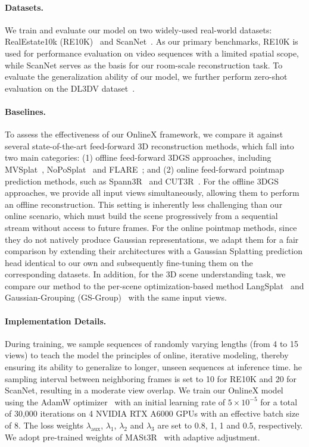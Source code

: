 \paragraph{Datasets.} We train and evaluate our model on two widely-used real-world datasets: RealEstate10k (RE10K)~\cite{zhou2018stereo} and ScanNet~\cite{dai2017scannet}. As our primary benchmarks, RE10K is used for performance evaluation on video sequences with a limited spatial scope, while ScanNet serves as the basis for our room-scale reconstruction task. To evaluate the generalization ability of our model, we further perform zero-shot evaluation on the DL3DV dataset~\cite{ling2024dl3dv}.

\paragraph{Baselines.} To assess the effectiveness of our OnlineX framework, we compare it against several state-of-the-art feed-forward 3D reconstruction methods, which fall into two main categories: (1) offline feed-forward 3DGS approaches, including MVSplat~\cite{chen2024mvsplat}, NoPoSplat~\cite{ye2024no} and FLARE~\cite{zhang2025flare}; and (2) online feed-forward pointmap prediction methods, such as Spann3R~\cite{wang20243d} and CUT3R~\cite{wang2025continuous}. For the offline 3DGS approaches, we provide all input views simultaneously, allowing them to perform an offline reconstruction. This setting is inherently less challenging than our online scenario, which must build the scene progressively from a sequential stream without access to future frames. For the online pointmap methods, since they do not natively produce Gaussian representations, we adapt them for a fair comparison by extending their architectures with a Gaussian Splatting prediction head identical to our own and subsequently fine-tuning them on the corresponding datasets. In addition, for the 3D scene understanding task, we compare our method to the per-scene optimization-based method LangSplat~\cite{qin2024langsplat} and Gaussian-Grouping (GS-Group)~\cite{ye2024gaussian} with the same input views.  



\paragraph{Implementation Details.} During training, we sample sequences of randomly varying lengths (from 4 to 15 views) to teach the model the principles of online, iterative modeling, thereby ensuring its ability to generalize to longer, unseen sequences at inference time. he sampling interval between neighboring frames is set to 10 for RE10K and 20 for ScanNet, resulting in a moderate view overlap. We train our OnlineX model using the AdamW optimizer~\cite{loshchilov2017fixing} with an initial learning rate of $5 \times 10^{-5}$ for a total of 30,000 iterations on 4 NVIDIA RTX A6000 GPUs with an effective batch size of 8. The loss weights $\lambda_{\text{aux}}$, $\lambda_{1}$, $\lambda_{2}$ and $\lambda_{3}$ are set to 0.8, 1, 1 and 0.5, respectively.  We adopt pre-trained weights of MASt3R~\cite{leroy2024grounding} with adaptive adjustment. 



